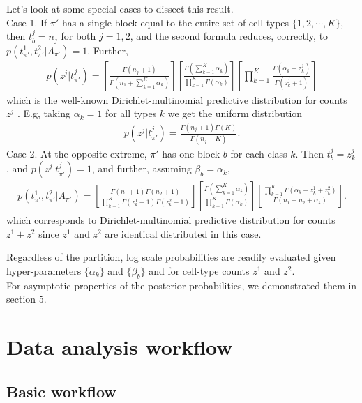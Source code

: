 \documentclass[11pt]{amsart}
\begin{document}
Let's look at some special cases to dissect this result. \\
Case 1. If $\pi'$ has a single block equal to the entire
 set of cell types $\{1,2, \cdots, K\}$,  then $t^j_b=n_j$ for both $j=1,2$,
and the second formula reduces, correctly, to 
$p(t^1_{\pi'},t^2_{\pi'}| A_{\pi'}) = 1$.  Further,
\begin{eqnarray*}
p(z^j|t^j_{\pi'}) = 
\left[ \frac{ \Gamma(n_j +1 ) }{ \Gamma( n_1 + \sum_{k=1}^K \alpha_k ) }
\right]
\left[ \frac{\Gamma( \sum_{k =1}^K \alpha_k )}{
                \prod_{k=1}^K \Gamma( \alpha_k ) } \right]
       \left[    \prod_{k=1}^K    \frac{  \Gamma(\alpha_k + z^j_k)}{
                \Gamma(z^j_k + 1 )}\right]
\end{eqnarray*}
which is the well-known Dirichlet-multinomial predictive distribution
for counts $z^j$ \cite{Wag}.  E.g, taking $\alpha_k=1$ for all types $k$ 
we get the uniform distribution
\begin{eqnarray*}
p(z^j|t^j_{\pi'}) = 
 \frac{ \Gamma(n_j +1 ) \Gamma(K) }{ \Gamma( n_j + K ) }.
\end{eqnarray*}
Case 2. At the opposite extreme, $\pi'$  has one block $b$ for each
 class $k$. Then $t^j_b = z^j_k$, and $p(z^j|t^j_{\pi'}) = 1$, and 
further, assuming $\beta_b = \alpha_k$,
\begin{eqnarray*}
p(t^1_{\pi'},t^2_{\pi'}| A_{\pi'}) =
 \left[ \frac{ \Gamma(n_1+1) \Gamma(n_2+1) }{ \prod_{k=1}^K 
   \Gamma(z^1_k+1) 
   \Gamma( z^2_k + 1 )} \right] 
\left[ \frac{\Gamma( \sum_{k=1}^K \alpha_k  )}{
   \prod_{k=1}^K \Gamma(\alpha_k )} \right] 
 \left[ \frac{ \prod_{k=1}^K \Gamma( \alpha_k + z^1_k + z^2_k )}{
	\Gamma( n_1 + n_2 + \alpha_k  )} \right].
\end{eqnarray*}
which corresponds to Dirichlet-multinomial predictive distribution for counts $z^1 + z^2$ 
since $z^1$ and $z^2$ are identical distributed in this case.

Regardless of the partition,
log scale probabilities are readily evaluated 
given hyper-parameters $\{ \alpha_k \}$ and $\{ \beta_b \}$ and for
cell-type counts $z^1$ and $z^2$. \\
For asymptotic properties of the posterior probabilities, we demonstrated them in section 5. 
 
\section{Data analysis workflow} 

\subsection{Basic workflow}\hfill\\ 
\end{document}
